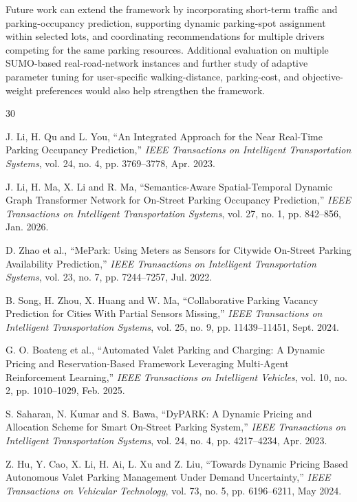 Future work can extend the framework by incorporating short-term traffic and parking-occupancy prediction, supporting dynamic parking-spot assignment within selected lots, and coordinating recommendations for multiple drivers competing for the same parking resources. Additional evaluation on multiple SUMO-based real-road-network instances and further study of adaptive parameter tuning for user-specific walking-distance, parking-cost, and objective-weight preferences would also help strengthen the framework.

\begin{thebibliography}{30}

J. Li, H. Qu and L. You, ``An Integrated Approach for the Near Real-Time Parking Occupancy Prediction,'' \emph{IEEE Transactions on Intelligent Transportation Systems}, vol. 24, no. 4, pp. 3769--3778, Apr. 2023.

J. Li, H. Ma, X. Li and R. Ma, ``Semantics-Aware Spatial-Temporal Dynamic Graph Transformer Network for On-Street Parking Occupancy Prediction,'' \emph{IEEE Transactions on Intelligent Transportation Systems}, vol. 27, no. 1, pp. 842--856, Jan. 2026.

D. Zhao et al., ``MePark: Using Meters as Sensors for Citywide On-Street Parking Availability Prediction,'' \emph{IEEE Transactions on Intelligent Transportation Systems}, vol. 23, no. 7, pp. 7244--7257, Jul. 2022.

B. Song, H. Zhou, X. Huang and W. Ma, ``Collaborative Parking Vacancy Prediction for Cities With Partial Sensors Missing,'' \emph{IEEE Transactions on Intelligent Transportation Systems}, vol. 25, no. 9, pp. 11439--11451, Sept. 2024.

G. O. Boateng et al., ``Automated Valet Parking and Charging: A Dynamic Pricing and Reservation-Based Framework Leveraging Multi-Agent Reinforcement Learning,'' \emph{IEEE Transactions on Intelligent Vehicles}, vol. 10, no. 2, pp. 1010--1029, Feb. 2025.

S. Saharan, N. Kumar and S. Bawa, ``DyPARK: A Dynamic Pricing and Allocation Scheme for Smart On-Street Parking System,'' \emph{IEEE Transactions on Intelligent Transportation Systems}, vol. 24, no. 4, pp. 4217--4234, Apr. 2023.

Z. Hu, Y. Cao, X. Li, H. Ai, L. Xu and Z. Liu, ``Towards Dynamic Pricing Based Autonomous Valet Parking Management Under Demand Uncertainty,'' \emph{IEEE Transactions on Vehicular Technology}, vol. 73, no. 5, pp. 6196--6211, May 2024.


\end{thebibliography}
